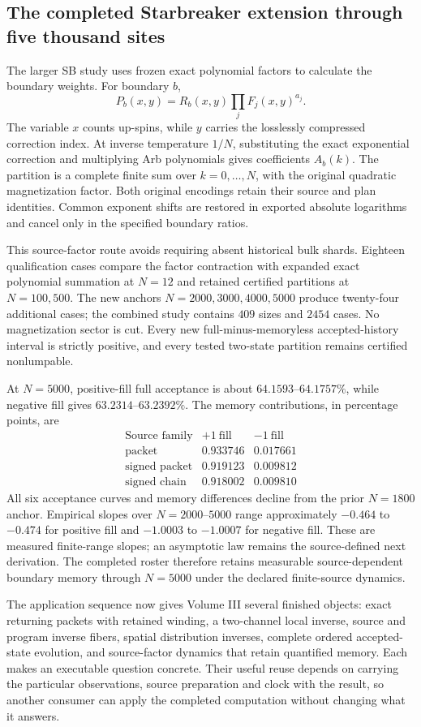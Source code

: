 \subsection{The completed Starbreaker extension through five thousand sites}

The larger SB study uses frozen exact polynomial factors to calculate the boundary weights. For boundary $b$,
\[
 P_b(x,y)=R_b(x,y)\prod_jF_j(x,y)^{a_j}.
\]
The variable $x$ counts up-spins, while $y$ carries the losslessly compressed correction index. At inverse temperature $1/N$, substituting the exact exponential correction and multiplying Arb polynomials gives coefficients $A_b(k)$. The partition is a complete finite sum over $k=0,\ldots,N$, with the original quadratic magnetization factor. Both original encodings retain their source and plan identities. Common exponent shifts are restored in exported absolute logarithms and cancel only in the specified boundary ratios. 

This source-factor route avoids requiring absent historical bulk shards. Eighteen qualification cases compare the factor contraction with expanded exact polynomial summation at $N=12$ and retained certified partitions at $N=100,500$. The new anchors $N=2000,3000,4000,5000$ produce twenty-four additional cases; the combined study contains $409$ sizes and $2454$ cases. No magnetization sector is cut. Every new full-minus-memoryless accepted-history interval is strictly positive, and every tested two-state partition remains certified nonlumpable.

At $N=5000$, positive-fill full acceptance is about $64.1593$--$64.1757\%$, while negative fill gives $63.2314$--$63.2392\%$. The memory contributions, in percentage points, are
\[
\begin{array}{l|rr}
 \text{Source family}&+1\ \text{fill}&-1\ \text{fill}\\\hline
 \text{packet}&0.933746&0.017661\\
 \text{signed packet}&0.919123&0.009812\\
 \text{signed chain}&0.918002&0.009810
\end{array}
\]
All six acceptance curves and memory differences decline from the prior $N=1800$ anchor. Empirical slopes over $N=2000$--$5000$ range approximately $-0.464$ to $-0.474$ for positive fill and $-1.0003$ to $-1.0007$ for negative fill. These are measured finite-range slopes; an asymptotic law remains the source-defined next derivation. The completed roster therefore retains measurable source-dependent boundary memory through $N=5000$ under the declared finite-source dynamics.

The application sequence now gives Volume III several finished objects: exact returning packets with retained winding, a two-channel local inverse, source and program inverse fibers, spatial distribution inverses, complete ordered accepted-state evolution, and source-factor dynamics that retain quantified memory. Each makes an executable question concrete. Their useful reuse depends on carrying the particular observations, source preparation and clock with the result, so another consumer can apply the completed computation without changing what it answers.
